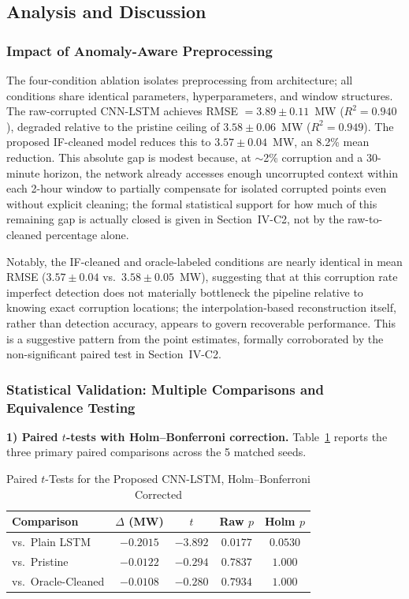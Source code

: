\documentclass[conference]{IEEEtran}
\begin{document}
\subsection{Analysis and Discussion}

\subsubsection{Impact of Anomaly-Aware Preprocessing}
The four-condition ablation isolates preprocessing from architecture; all conditions share identical parameters, hyperparameters, and window structures. The raw-corrupted CNN-LSTM achieves RMSE $=3.89 \pm 0.11$~MW ($R^2 = 0.940$), degraded relative to the pristine ceiling of $3.58 \pm 0.06$~MW ($R^2 = 0.949$). The proposed IF-cleaned model reduces this to $3.57 \pm 0.04$~MW, an 8.2\% mean reduction. This absolute gap is modest because, at $\sim$2\% corruption and a 30-minute horizon, the network already accesses enough uncorrupted context within each 2-hour window to partially compensate for isolated corrupted points even without explicit cleaning; the formal statistical support for how much of this remaining gap is actually closed is given in Section~IV-C2, not by the raw-to-cleaned percentage alone.

Notably, the IF-cleaned and oracle-labeled conditions are nearly identical in mean RMSE ($3.57 \pm 0.04$ vs.\ $3.58 \pm 0.05$~MW), suggesting that at this corruption rate imperfect detection does not materially bottleneck the pipeline relative to knowing exact corruption locations; the interpolation-based reconstruction itself, rather than detection accuracy, appears to govern recoverable performance. This is a suggestive pattern from the point estimates, formally corroborated by the non-significant paired test in Section~IV-C2.

\subsubsection{Statistical Validation: Multiple Comparisons and Equivalence Testing}
\label{sec:stats_results}

\textbf{1) Paired $t$-tests with Holm--Bonferroni correction.} Table~\ref{tab:stats} reports the three primary paired comparisons across the 5 matched seeds.

\begin{table}[H]
\centering
\caption{Paired $t$-Tests for the Proposed CNN-LSTM, Holm--Bonferroni Corrected}
\label{tab:stats}
\footnotesize
\begin{tabular}{@{}lcccc@{}}
\toprule
\textbf{Comparison} & \textbf{$\Delta$ (MW)} & \textbf{$t$} & \textbf{Raw $p$} & \textbf{Holm $p$} \\
\midrule
vs.\ Plain LSTM   & $-0.2015$ & $-3.892$ & $0.0177$ & $0.0530$ \\
vs.\ Pristine     & $-0.0122$ & $-0.294$ & $0.7837$ & $1.000$ \\
vs.\ Oracle-Cleaned & $-0.0108$ & $-0.280$ & $0.7934$ & $1.000$ \\
\bottomrule
\end{tabular}
\end{table}
\end{document}

